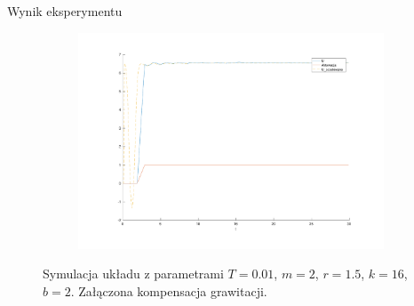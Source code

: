 \documentclass{beamer}
\begin{document}
\begin{frame}[allowframebreaks]{Wynik eksperymentu}
\begin{figure}
	\begin{subfigure}{.5\textwidth}
		\centering
		\includegraphics[width=\linewidth]{mrozenie_u}
		\label{fig:mrozenie_u}
	\end{subfigure}

	\caption{Symulacja układu z parametrami $T=0.01$, $m = 2$, $r = 1.5$, $k = 16$, $b = 2$. Załączona kompensacja grawitacji.}
	\label{fig:mrozenie}
\end{figure}
\end{frame}
\end{document}
